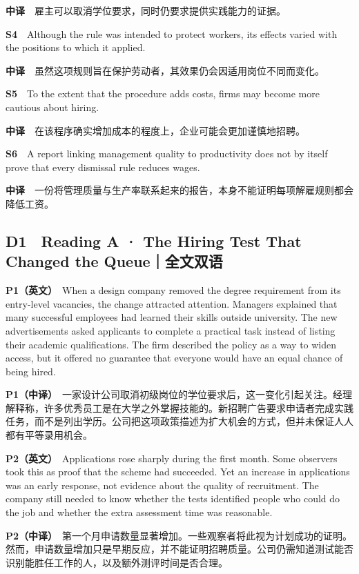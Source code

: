 \documentclass[
  11pt,
]{ctexart}
\begin{document}
\textbf{中译}　雇主可以取消学位要求，同时仍要求提供实践能力的证据。

\textbf{S4}　Although the rule was intended to protect workers, its
effects varied with the positions to which it applied.

\textbf{中译}　虽然这项规则旨在保护劳动者，其效果仍会因适用岗位不同而变化。

\textbf{S5}　To the extent that the procedure adds costs, firms may
become more cautious about hiring.

\textbf{中译}　在该程序确实增加成本的程度上，企业可能会更加谨慎地招聘。

\textbf{S6}　A report linking management quality to productivity does
not by itself prove that every dismissal rule reduces wages.

\textbf{中译}　一份将管理质量与生产率联系起来的报告，本身不能证明每项解雇规则都会降低工资。

\subsection{D1　Reading A · The Hiring Test That Changed the
Queue｜全文双语}\label{d1-reading-a-the-hiring-test-that-changed-the-queueux5168ux6587ux53ccux8bed}

\textbf{P1（英文）}　When a design company removed the degree
requirement from its entry-level vacancies, the change attracted
attention. Managers explained that many successful employees had learned
their skills outside university. The new advertisements asked applicants
to complete a practical task instead of listing their academic
qualifications. The firm described the policy as a way to widen access,
but it offered no guarantee that everyone would have an equal chance of
being hired.

\textbf{P1（中译）}　一家设计公司取消初级岗位的学位要求后，这一变化引起关注。经理解释称，许多优秀员工是在大学之外掌握技能的。新招聘广告要求申请者完成实践任务，而不是列出学历。公司把这项政策描述为扩大机会的方式，但并未保证人人都有平等录用机会。

\textbf{P2（英文）}　Applications rose sharply during the first month.
Some observers took this as proof that the scheme had succeeded. Yet an
increase in applications was an early response, not evidence about the
quality of recruitment. The company still needed to know whether the
tests identified people who could do the job and whether the extra
assessment time was reasonable.

\textbf{P2（中译）}　第一个月申请数量显著增加。一些观察者将此视为计划成功的证明。然而，申请数量增加只是早期反应，并不能证明招聘质量。公司仍需知道测试能否识别能胜任工作的人，以及额外测评时间是否合理。
\end{document}
